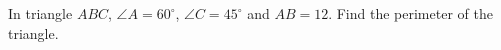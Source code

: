 In triangle $ABC$, $\angle A=60^\circ$, $\angle C=45^\circ$ and $AB=12$. Find the perimeter of the triangle.
